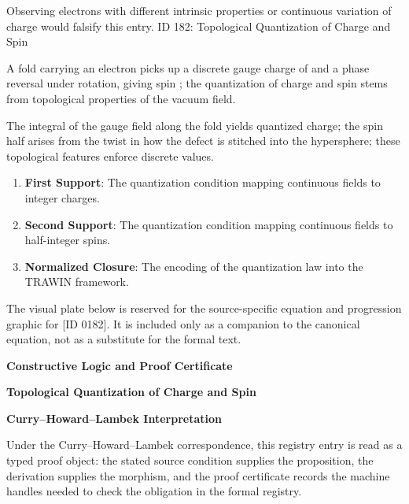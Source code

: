 Observing electrons with different intrinsic properties or continuous variation of charge would falsify this entry. ID 182: Topological Quantization of Charge and Spin  

A fold carrying an electron picks up a discrete gauge charge of and a phase reversal under rotation, giving spin ; the quantization of charge and spin stems from topological properties of the vacuum field.  

The integral of the gauge field along the fold yields quantized charge; the spin half arises from the twist in how the defect is stitched into the hypersphere; these topological features enforce discrete values.  
\endgroup

\begin{enumerate}[leftmargin=1.6em,itemsep=6pt,topsep=4pt]
\item \textbf{First Support}: The quantization condition mapping continuous fields to integer charges.
\item \textbf{Second Support}: The quantization condition mapping continuous fields to half-integer spins.
\item \textbf{Normalized Closure}: The encoding of the quantization law into the TRAWIN framework.
\end{enumerate}

\begingroup\footnotesize\sloppy
The visual plate below is reserved for the source-specific equation and progression graphic for [ID 0182]. It is included only as a companion to the canonical equation, not as a substitute for the formal text.
\par\endgroup
\ifTZPDarkEdition
{}
\fi

\clearpage
\begingroup\tzpsupportsetup
\noindent\textbf{\fontsize{10.8pt}{12.8pt}\selectfont [ID 0182] Constructive Logic and Proof Certificate}\par
\noindent\textbf{\fontsize{10pt}{12pt}\selectfont Topological Quantization of Charge and Spin}\par
\vspace{0.45em}
\begingroup
\footnotesize
\setlength{\parskip}{0.22em}
\setlength{\parindent}{0pt}
\noindent\textbf{Curry--Howard--Lambek Interpretation}\par
Under the Curry--Howard--Lambek correspondence, this registry entry is read as a typed proof
object: the stated source condition supplies the proposition, the derivation supplies the
morphism, and the proof certificate records the machine handles needed to check the obligation
in the formal registry.

